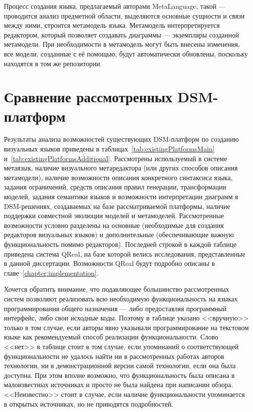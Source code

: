 Процесс создания языка, предлагаемый авторами MetaLanguage, такой --- проводится анализ 
предметной области, выделяются основные сущности и связи между ними, строится метамодель языка.
Метамодель интерпретируется редактором, который позволяет создавать диаграммы --- экземпляры
созданной метамодели. При необходимости в метамодель могут быть внесены изменения, все 
модели, созданные с её помощью, будут автоматически обновлены, поскольку находятся в том же репозитории.

\section{Сравнение рассмотренных DSM-платформ}
Результаты анализа возможностей существующих \ac{DSM}-платформ по созданию визуальных 
языков приведены в таблицах~\ref{tab:existingPlatformsMain} и~\ref{tab:existingPlatformsAdditional}.
Рассмотрены используемый в системе метаязык, наличие визуального метаредактора (или других способов описания метамодели),
наличие возможности описания конкретного синтаксиса языка, задания ограничений, средств описания
правил генерации, трансформации моделей, задания семантики языков и возможности интерпретации
диаграмм в \ac{DSM}-решениях, создаваемых на базе рассматриваемой платформы, наличие поддержки совместной
эволюции моделей и метамоделей. Рассмотренные возможности условно разделены на основные 
(необходимые для создания редакторов визуальных языков) и дополнительные (обеспечивающие
важную функциональность помимо редакторов). Последней строкой в каждой таблице приведена 
система QReal, на базе которой велись исследования, представленные в данной диссертации.
Возможности QReal будут подробно описаны в главе~\ref{chapter:implementation}.

Хочется обратить внимание, что подавляющее большинство рассмотренных систем позволяют реализовать
всю необходимую функциональность на языках программирования общего назначения --- либо 
предоставляя программный интерфейс, либо свои исходные коды. Поэтому в таблице указано
<<вручную>> только в том случае, если авторы явно указывали программирование на текстовом языке
как рекомендуемый способ реализации функциональности. Слово <<нет>> в таблице стоит в том
случае, если упоминаний о соответствующей функциональности не удалось найти ни в рассмотренных 
работах авторов технологии, ни в демонстрационной версии самой технологии, если она была доступна.
При этом вполне возможно, что функциональность была описана в малоизвестных источниках и просто
не была найдена при написании обзора. <<Неизвестно>> стоит в случае, если наличие функциональности
упоминается в открытых источниках, но не приводятся подробностей.

